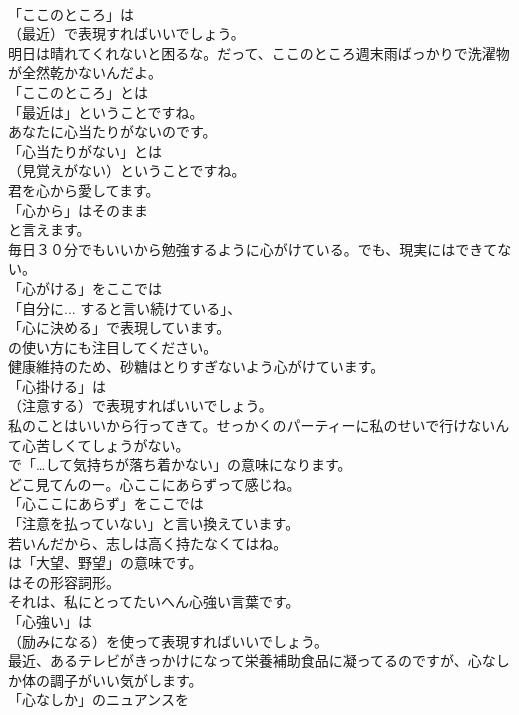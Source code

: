 \documentclass[8pt]{extreport}
\begin{document}
\begin{CJK}{UTF8}{min}
\\	「ここのところ」は 
\\	（最近）で表現すればいいでしょう。	
\\	明日は晴れてくれないと困るな。だって、ここのところ週末雨ばっかりで洗濯物が全然乾かないんだよ。 
\\	「ここのところ」とは
\\	「最近は」ということですね。	
\\	あなたに心当たりがないのです。 
\\	「心当たりがない」とは
\\	（見覚えがない）ということですね。	
\\	君を心から愛してます。 
\\	「心から」はそのまま
\\	と言えます。	
\\	毎日３０分でもいいから勉強するように心がけている。でも、現実にはできてない。 
\\	「心がける」をここでは
\\	「自分に... すると言い続けている」、
\\	「心に決める」で表現しています。
\\	の使い方にも注目してください。	
\\	健康維持のため、砂糖はとりすぎないよう心がけています。 
\\	「心掛ける」は
\\	（注意する）で表現すればいいでしょう。	
\\	私のことはいいから行ってきて。せっかくのパーティーに私のせいで行けないんて心苦しくてしょうがない。 
\\	で「…して気持ちが落ち着かない」の意味になります。	
\\	どこ見てんのー。心ここにあらずって感じね。 
\\	「心ここにあらず」をここでは
\\	「注意を払っていない」と言い換えています。	
\\	若いんだから、志しは高く持たなくてはね。 
\\	は「大望、野望」の意味です。
\\	はその形容詞形。	
\\	それは、私にとってたいへん心強い言葉です。 
\\	「心強い」は 
\\	（励みになる）を使って表現すればいいでしょう。	
\\	最近、あるテレビがきっかけになって栄養補助食品に凝ってるのですが、心なしか体の調子がいい気がします。 
\\	「心なしか」のニュアンスを 

\end{CJK}
\end{document}
